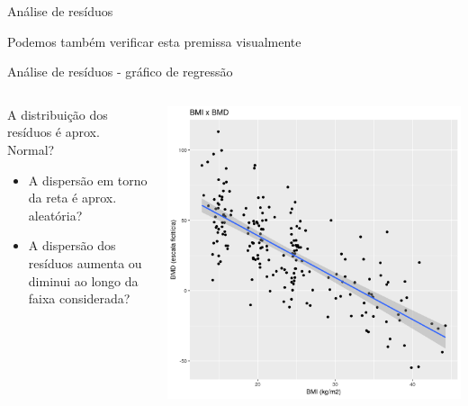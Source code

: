 \documentclass{beamer}
\begin{document}
\begin{frame}{Análise de resíduos}
  \begin{center}
    \Large
    Podemos também verificar esta premissa visualmente
  \end{center}
\end{frame}

\begin{frame}{\footnotesize Análise de resíduos - gráfico de regressão}
  \begin{columns}
    \begin{column}{5cm}
      A distribuição dos resíduos é aprox. Normal?
      \bigskip
      \begin{itemize}
        \footnotesize
      \item A dispersão em torno da reta é aprox. aleatória?
        \bigskip
      \item A dispersão dos resíduos aumenta ou diminui ao longo da faixa considerada?
      \end{itemize}
    \end{column}
    \begin{column}{5cm}
      \begin{center}
        \includegraphics[width=1.1\textwidth]{Cap18-19/pratica-plot2}
      \end{center}
    \end{column}
  \end{columns}
\end{frame}
\end{document}
